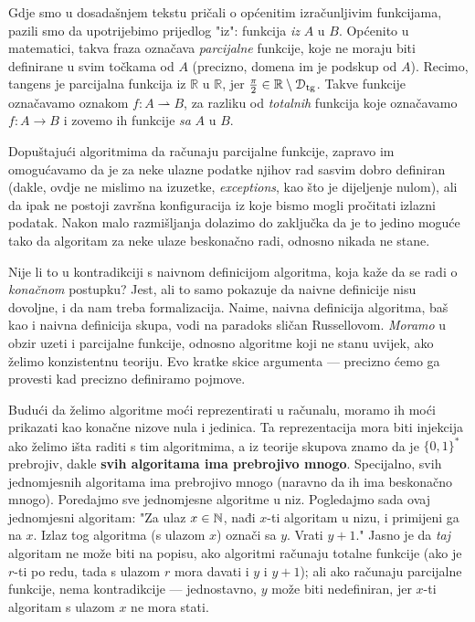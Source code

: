 Gdje smo u dosadašnjem tekstu pričali o općenitim izračunljivim funkcijama, pazili smo da  upotrijebimo prijedlog "iz": funkcija \emph{iz} $A$ u $B$. Općenito u matematici, takva fraza označava \emph{parcijalne} funkcije, koje ne moraju biti definirane u svim točkama od $A$ (precizno, domena im je podskup od $A$). Recimo, tangens je parcijalna funkcija iz $\mathbb R$ u $\mathbb R$, jer $\frac{\pi}{2}\in\mathbb R\setminus \mathcal D_{\text{tg}}$. Takve funkcije označavamo oznakom $f\colon A\rightharpoonup B$, za razliku od \emph{totalnih} funkcija koje označavamo $f\colon A\to B$ i zovemo ih funkcije \emph{sa} $A$ u $B$. 

Dopuštajući algoritmima da računaju parcijalne funkcije, zapravo im omogućavamo da je za neke ulazne podatke njihov rad sasvim dobro definiran (dakle, ovdje ne mislimo na izuzetke, \emph{exceptions}, kao što je dijeljenje nulom), ali da ipak ne postoji završna konfiguracija iz koje bismo mogli pročitati izlazni podatak. Nakon malo razmišljanja dolazimo do zaključka da je to jedino moguće tako da algoritam za neke ulaze beskonačno radi, odnosno nikada ne stane.

Nije li to u kontradikciji s naivnom definicijom algoritma, koja kaže da se radi o \emph{konačnom} postupku? Jest, ali to samo pokazuje da naivne definicije nisu dovoljne, i da nam treba formalizacija. Naime, naivna definicija algoritma, baš kao i naivna definicija skupa, vodi na paradoks sličan Russellovom. \emph{Moramo} u obzir uzeti i parcijalne funkcije, odnosno algoritme koji ne stanu uvijek, ako želimo konzistentnu teoriju. Evo kratke skice argumenta --- precizno ćemo ga provesti kad precizno definiramo pojmove.

Budući da želimo algoritme moći reprezentirati u računalu, moramo ih moći prikazati kao konačne nizove nula i jedinica. Ta reprezentacija mora biti injekcija ako želimo išta raditi s tim algoritmima, a iz teorije skupova znamo da je $\{0,1\}^*$ prebrojiv, dakle \textbf{svih algoritama ima prebrojivo mnogo}. Specijalno, svih jednomjesnih algoritama  ima prebrojivo mnogo (naravno da ih ima beskonačno mnogo). Poredajmo sve jednomjesne algoritme u niz. Pogledajmo sada ovaj jednomjesni algoritam: "Za ulaz $x\in{\mathbb N}$, nađi $x$-ti algoritam u nizu, i primijeni ga na $x$. Izlaz tog algoritma (s ulazom $x$) označi sa $y$. Vrati $y+1$." Jasno je da \emph{taj} algoritam ne može biti na popisu, ako algoritmi računaju totalne funkcije (ako je $r$-ti po redu, tada s ulazom $r$ mora davati i $y$ i $y+1$); ali ako računaju parcijalne funkcije, nema kontradikcije --- jednostavno, $y$ može biti nedefiniran, jer $x$-ti algoritam s ulazom $x$ ne mora stati.

